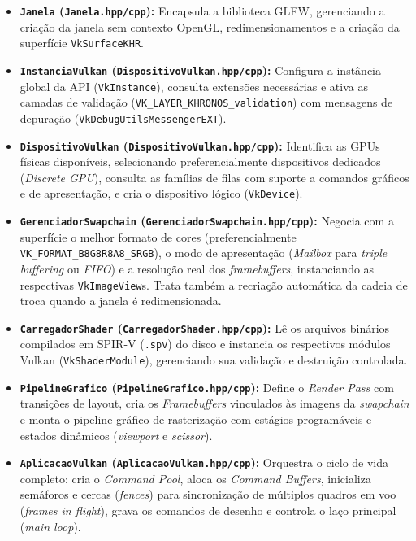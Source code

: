\begin{itemize}
    \setlength{\itemsep}{0pt}
    \item \textbf{\texttt{Janela} (\texttt{Janela.hpp/cpp}):} Encapsula a biblioteca GLFW, gerenciando a criação da janela sem contexto OpenGL, redimensionamentos e a criação da superfície \texttt{VkSurfaceKHR}.
    \item \textbf{\texttt{InstanciaVulkan} (\texttt{DispositivoVulkan.hpp/cpp}):} Configura a instância global da API (\texttt{VkInstance}), consulta extensões necessárias e ativa as camadas de validação (\texttt{VK\_LAYER\_KHRONOS\_validation}) com mensagens de depuração (\texttt{VkDebugUtilsMessengerEXT}).
    \item \textbf{\texttt{DispositivoVulkan} (\texttt{DispositivoVulkan.hpp/cpp}):} Identifica as GPUs físicas disponíveis, selecionando preferencialmente dispositivos dedicados (\textit{Discrete GPU}), consulta as famílias de filas com suporte a comandos gráficos e de apresentação, e cria o dispositivo lógico (\texttt{VkDevice}).
    \item \textbf{\texttt{GerenciadorSwapchain} (\texttt{GerenciadorSwapchain.hpp/cpp}):} Negocia com a superfície o melhor formato de cores (preferencialmente \texttt{VK\_FORMAT\_B8G8R8A8\_SRGB}), o modo de apresentação (\textit{Mailbox} para \textit{triple buffering} ou \textit{FIFO}) e a resolução real dos \textit{framebuffers}, instanciando as respectivas \texttt{VkImageView}s. Trata também a recriação automática da cadeia de troca quando a janela é redimensionada.
    \item \textbf{\texttt{CarregadorShader} (\texttt{CarregadorShader.hpp/cpp}):} Lê os arquivos binários compilados em SPIR-V (\texttt{.spv}) do disco e instancia os respectivos módulos Vulkan (\texttt{VkShaderModule}), gerenciando sua validação e destruição controlada.
    \item \textbf{\texttt{PipelineGrafico} (\texttt{PipelineGrafico.hpp/cpp}):} Define o \textit{Render Pass} com transições de layout, cria os \textit{Framebuffers} vinculados às imagens da \textit{swapchain} e monta o pipeline gráfico de rasterização com estágios programáveis e estados dinâmicos (\textit{viewport} e \textit{scissor}).
    \item \textbf{\texttt{AplicacaoVulkan} (\texttt{AplicacaoVulkan.hpp/cpp}):} Orquestra o ciclo de vida completo: cria o \textit{Command Pool}, aloca os \textit{Command Buffers}, inicializa semáforos e cercas (\textit{fences}) para sincronização de múltiplos quadros em voo (\textit{frames in flight}), grava os comandos de desenho e controla o laço principal (\textit{main loop}).
\end{itemize}

